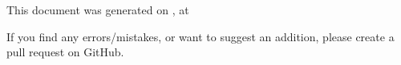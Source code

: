 \documentclass[dvipsnames]{article}
\begin{document}

{
    \color{gray}
    \setlength\topsep{0pt}
    \setlength\parskip{0pt}
    \begin{center}
        This document was generated on \DTMtoday, at \DTMcurrenttime
    \end{center}
    \begin{center}
        If you find any errors/mistakes, or want to suggest an addition, please create a pull request on GitHub.
    \end{center}
}

\label{LastPage}
\end{document}

